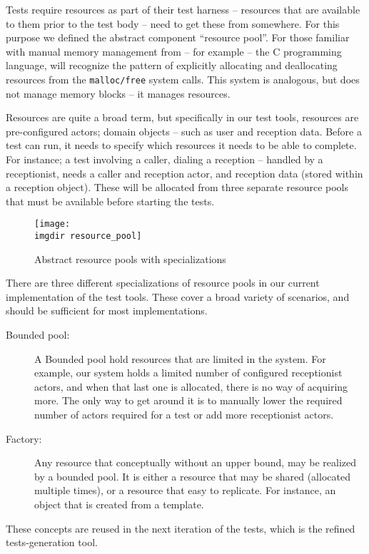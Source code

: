 \noindent Tests require resources as part of their test harness -- resources that are available to them prior to the test body -- need to get these from somewhere. For this purpose we defined the abstract component ``resource pool''. For those familiar with manual memory management from -- for example -- the C programming language, will recognize the pattern of explicitly allocating and deallocating resources from the \texttt{malloc/free} system calls. This system is analogous, but does not manage memory blocks -- it manages resources.\medskip

\noindent Resources are quite a broad term, but specifically in our test tools, resources are pre-configured actors; domain objects -- such as user and reception data. Before a test can run, it needs to specify which resources it needs to be able to complete. For instance; a test involving a caller, dialing a reception -- handled by a receptionist, needs a caller and reception actor, and reception data (stored within a reception object). These will be allocated from three separate resource pools that must be available before starting the tests.\medskip
\begin{figure}[!htbp]
\centering
\texttt{[image: \\imgdir resource\_pool]}
\caption{Abstract resource pools with specializations}
\label{fig:resource_pool}
\end{figure}There are three different specializations of resource pools in our current implementation of the test tools. These cover a broad variety of scenarios, and should be sufficient for most implementations.
\begin{description}
  \item[Bounded pool:] A Bounded pool hold resources that are limited in the system. For example, our system holds a limited number of configured receptionist actors, and when that last one is allocated, there is no way of acquiring more. The only way to get around it is to manually lower the required number of actors required for a test or add more receptionist actors.
  \item[Factory:] Any resource that conceptually without an upper bound, may be realized by a bounded pool. It is either a resource that may be shared (allocated multiple times), or a resource that easy to replicate. For instance, an object that is created from a template.
\end{description}
These concepts are reused in the next iteration of the tests, which is the refined tests-generation tool.

